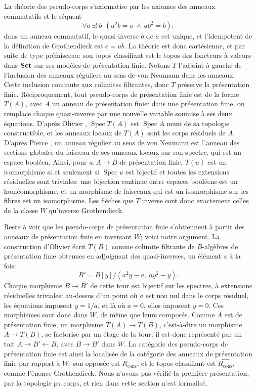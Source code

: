 La théorie des pseudo-corps s'axiomatise par les axiomes des anneaux commutatifs et le séquent
\[
\forall a\ \exists!\,b\ \ (a^2b = a\ \wedge\ ab^2 = b):
\]
dans un anneau commutatif, le quasi-inverse $b$ de $a$ est unique, et l'idempotent de la définition de Grothendieck est $e = ab$. La théorie est donc cartésienne, et par suite de type préfaisceau: son topos classifiant est le topos des foncteurs à valeurs dans $\mathbf{Set}$ sur ses modèles de présentation finie. Notons $T$ l'adjoint à gauche de l'inclusion des anneaux réguliers au sens de von Neumann dans les anneaux. Cette inclusion commute aux colimites filtrantes, donc $T$ préserve la présentation finie. Réciproquement, tout pseudo-corps de présentation finie est de la forme $T(A)$, avec $A$ un anneau de présentation finie: dans une présentation finie, on remplace chaque quasi-inverse par une nouvelle variable soumise à ses deux équations. D'après Olivier \cite{olivier}, $\operatorname{Spec}T(A)$ est $\operatorname{Spec}A$ muni de sa topologie constructible, et les anneaux locaux de $T(A)$ sont les corps résiduels de $A$. D'après Pierce \cite{pierce}, un anneau régulier au sens de von Neumann est l'anneau des sections globales du faisceau de ses anneaux locaux sur son spectre, qui est un espace booléen. Ainsi, pour $u:A\to B$ de présentation finie, $T(u)$ est un isomorphisme si et seulement si $\operatorname{Spec}u$ est bijectif et toutes les extensions résiduelles sont triviales: une bijection continue entre espaces booléens est un homéomorphisme, et un morphisme de faisceaux qui est un isomorphisme sur les fibres est un isomorphisme. Les flèches que $T$ inverse sont donc exactement celles de la classe $W$ qu'inverse Grothendieck.

Reste à voir que les pseudo-corps de présentation finie s'obtiennent à partir des anneaux de présentation finie en inversant $W$; voici notre argument. La construction d'Olivier écrit $T(B)$ comme colimite filtrante de $B$-algèbres de présentation finie obtenues en adjoignant des quasi-inverses, un élément $a$ à la fois:
\[
B' = B[y]/(a^2y - a,\ ay^2 - y).
\]
Chaque morphisme $B\to B'$ de cette tour est bijectif sur les spectres, à extensions résiduelles triviales: au-dessus d'un point où $a$ est non nul dans le corps résiduel, les équations imposent $y = 1/a$, et là où $a = 0$, elles imposent $y = 0$. Ces morphismes sont donc dans $W$, de même que leurs composés. Comme $A$ est de présentation finie, un morphisme $T(A)\to T(B)$, c'est-à-dire un morphisme $A\to T(B)$, se factorise par un étage de la tour; il est donc représenté par un toit $A\to B'\leftarrow B$, avec $B\to B'$ dans $W$. La catégorie des pseudo-corps de présentation finie est ainsi la localisée de la catégorie des anneaux de présentation finie par rapport à $W$; son opposée est $R_{\mathrm{cons}}$, et le topos classifiant est $\widehat{R_{\mathrm{cons}}}$, comme l'énonce Grothendieck. Nous n'avons pas vérifié la première présentation, par la topologie $\mathrm{ps.\,corps}$, et rien dans cette section n'est formalisé.

